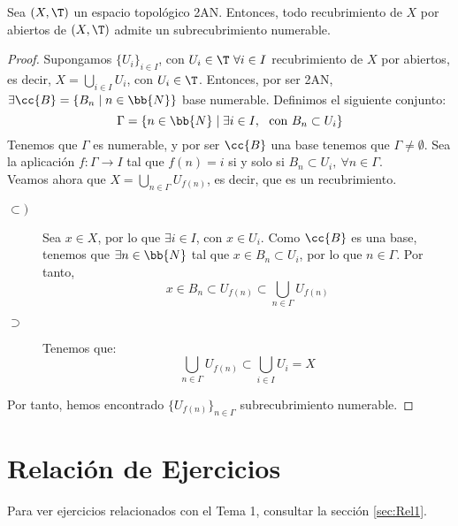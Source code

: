 \begin{prop}
    Sea $(X,\T)$ un espacio topológico 2AN. Entonces, todo recubrimiento de $X$ por abiertos de $(X,\T)$ admite un subrecubrimiento numerable.
\end{prop}
\begin{proof}
    Supongamos $\{U_i\}_{i\in I}$, con $U_i\in \T~\forall i\in I$ recubrimiento de $X$ por abiertos, es decir, $X=\bigcup\limits_{i\in I} U_i$, con $U_i\in \T$. Entonces, por ser 2AN, $\exists \cc{B}=\{B_n\mid n\in \bb{N}\}$ base numerable. Definimos el siguiente conjunto:
    \begin{equation*}
        \Gamma = \{n\in \bb{N}\mid \exists i\in I,~\text{ con }B_n\subset U_i\}
    \end{equation*}
    Tenemos que $\Gamma$ es numerable, y por ser $\cc{B}$ una base tenemos que $\Gamma\neq \emptyset$. Sea la aplicación $f:\Gamma\to I$ tal que $f(n)=i$ si y solo si $B_{n}\subset U_{i},~\forall n\in \Gamma$.\\

    Veamos ahora que $X=\bigcup\limits_{n\in \Gamma}U_{f(n)}$, es decir, que es un recubrimiento.
    \begin{description}
        \item[$\subset)$] Sea $x\in X$, por lo que $\exists i\in I$, con $x\in U_i$. Como $\cc{B}$ es una base, tenemos que $\exists n\in \bb{N}$ tal que $x\in B_n\subset U_i$, por lo que $n\in \Gamma$. Por tanto, $$x\in B_n\subset U_{f(n)} \subset \bigcup\limits_{n\in \Gamma}U_{f(n)}$$

        \item[$\supset$] Tenemos que:
        $$\bigcup\limits_{n\in \Gamma}U_{f(n)} \subset \bigcup\limits_{i\in I}U_{i}=X$$
    \end{description}

    Por tanto, hemos encontrado $\{U_{f(n)}\}_{n\in \Gamma}$ subrecubrimiento numerable.
\end{proof}

\section{Relación de Ejercicios}
Para ver ejercicios relacionados con el Tema 1, consultar la sección \ref{sec:Rel1}.
